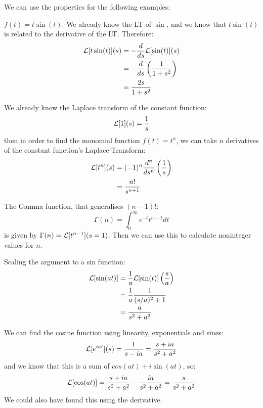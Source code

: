 \documentclass[../Main.tex]{subfiles}
\begin{document}
\begin{examples}{
        We can use the properties for the following examples:
    }
    \item $f(t) = t\sin(t)$. We already know the LT of $\sin$, and we know that $t\sin(t)$ is related to the derivative of the LT. Therefore:
        \begin{align*}
            \mathcal{L}[t\sin(t)](s) &= -\frac{d}{ds} \mathcal{L}[\sin(t)](s) \\
            &= -\frac{d}{ds} \left(\frac{1}{1 + s^2}\right) \\
            &= \frac{2s}{1 + s^2}
        \end{align*}
    \item We already know the Laplace transform of the constant function:
        \begin{equation*}
            \mathcal{L}[1](s) = \frac{1}{s}
        \end{equation*}
        then in order to find the monomial function $f(t) = t^n$, we can take $n$ derivatives of the constant function's Laplace Transform:
        \begin{align*}
            \mathcal{L}[t^n](s) &= (-1)^n \frac{d^{n}}{ds^{n}} \left(\frac1s\right) \\
            &= \frac{n!}{s^{n+1}}
        \end{align*}
    \item The Gamma function, that generalises $(n-1)!$:
        \begin{equation*}
            \Gamma(n) = \int_{0}^{\infty} e^{-t} t^{n-1} dt
        \end{equation*}
        is given by $\Gamma(n) = \mathcal{L}[t^{n-1}](s = 1)$. Then we can use this to calculate noninteger values for $n$.
    \item Scaling the argument to a sin function: 
        \begin{align*}
            \mathcal{L}[\sin(a t)] &= \frac1a \mathcal{L}[\sin(t)]\left(\frac{s}{a}\right) \\
            &= \frac1a \frac{1}{(s / a)^2 + 1} \\
            &= \frac{a}{s^2 + a^2}
        \end{align*}
    \item We can find the cosine function using linearity, exponentials and sines:
        \begin{equation*}
            \mathcal{L}[e^{iat}](s) = \frac{1}{s-ia} = \frac{s + ia}{s^2 + a^2}
        \end{equation*}
        and we know that this is a sum of $cos(at) + i\sin(at)$, so:
        \begin{equation*}
            \mathcal{L}[\cos(at)] = \frac{s + ia}{s^2 + a^2} - \frac{ia}{s^2 + a^2} = \frac{s}{s^2 + a^2}
        \end{equation*}
        We could also have found this using the derivative.
\end{examples}
\end{document}

